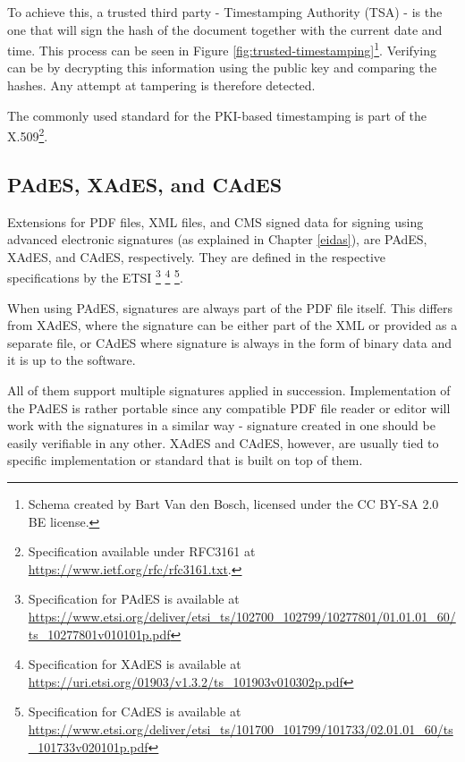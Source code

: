 \documentclass[thesismargins, english, thesislinespacing, twoside, openright, upjsfrontpage]{rnthesis}
\begin{document}
To achieve this, a trusted third party - Timestamping Authority (TSA) - is the one that will sign the hash of the document together with the current date and time.
This process can be seen in Figure \ref{fig:trusted-timestamping}\footnote{Schema created by Bart Van den Bosch, licensed under the CC BY-SA 2.0 BE license.}.
Verifying can be by decrypting this information using the public key and comparing the hashes. Any attempt at tampering is therefore detected.


The commonly used standard for the PKI-based timestamping is part of the X.509\footnote{Specification available under RFC3161 at \url{https://www.ietf.org/rfc/rfc3161.txt}.}.

\subsection{PAdES, XAdES, and CAdES}

Extensions for PDF files, XML files, and CMS signed data for signing using advanced electronic signatures (as explained in Chapter \ref{eidas}), are PAdES, XAdES, and CAdES, respectively.
They are defined in the respective specifications by the ETSI \footnote{Specification for PAdES is available at \url{https://www.etsi.org/deliver/etsi_ts/102700_102799/10277801/01.01.01_60/ts_10277801v010101p.pdf}} \footnote{Specification for XAdES is available at \url{https://uri.etsi.org/01903/v1.3.2/ts_101903v010302p.pdf}} \footnote{Specification for CAdES is available at \url{https://www.etsi.org/deliver/etsi_ts/101700_101799/101733/02.01.01_60/ts_101733v020101p.pdf}}.

When using PAdES, signatures are always part of the PDF file itself. This differs from XAdES, where the signature can be either part of the XML or provided as a separate file, or CAdES where signature is always in the form of binary data and it is up to the software.

All of them support multiple signatures applied in succession. Implementation of the PAdES is rather portable since any compatible PDF file reader or editor will work with the signatures in a similar way - signature created in one should be easily verifiable in any other. XAdES and CAdES, however, are usually tied to specific implementation or standard that is built on top of them.
\end{document}
